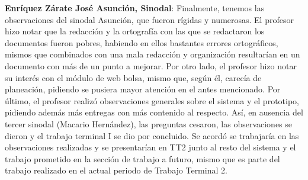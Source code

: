 \newline
\newline
\textbf{Enríquez Zárate José Asunción, Sinodal}: Finalmente, tenemos las observaciones del sinodal Asunción, que fueron rígidas y numerosas. El profesor hizo notar que la redacción y la ortografía con las que se redactaron los documentos fueron pobres, habiendo en ellos bastantes errores ortográficos, mismos que combinados con una mala redacción y organización resultarían en un documento con más de un punto a mejorar. Por otro lado, el profesor hizo notar su interés con el módulo de web bolsa, mismo que, según él, carecía de planeación, pidiendo se pusiera mayor atención en el antes mencionado. Por último, el profesor realizó observaciones generales sobre el sistema y el prototipo, pidiendo además más entregas con más contenido al respecto.
\newline
\newline
Así, en ausencia del tercer sinodal (Macario Hernández), las preguntas cesaron, las observaciones se dieron y el trabajo terminal I se dio por concluido. Se acordó se trabajaría en las observaciones realizadas y se presentarían en TT2 junto al resto del sistema y el trabajo prometido en la sección de trabajo a futuro, mismo que es parte del trabajo realizado en el actual periodo de Trabajo Terminal 2.